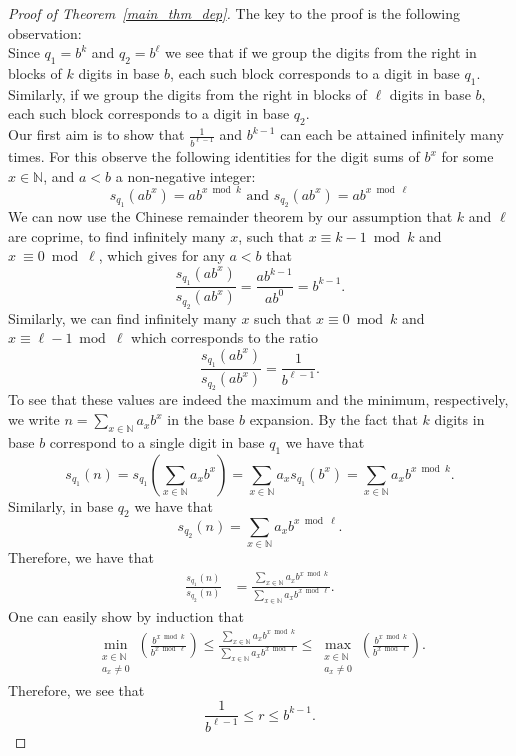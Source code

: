 \documentclass[10pt,a4paper]{amsart}
\newcommand\NN{\mathbb{N}}
\renewcommand{\leq}{\leqslant}
\begin{document}
\begin{proof}[Proof of Theorem~\ref{main_thm_dep}]
	The key to the proof is the following observation:\\
	Since $q_1=b^k$ and $q_2=b^{\ell}$ we see that if we group the digits from the right in blocks of $k$ digits in base $b$, each such block corresponds to a digit in base $q_1$. Similarly, if we group the digits from the right in blocks of $\ell$ digits in base $b$, each such block corresponds to a digit in base $q_2$.\\
	Our first aim is to show that $\frac{1}{b^{\ell-1}}$ and $b^{k-1}$ can each be attained infinitely many times. For this observe the following identities for the digit sums of $b^x$ for some $x\in \NN$, and $a < b$ a non-negative integer:
	\[
	s_{q_1}(ab^x)=ab^{x\bmod k} \text{ and } s_{q_2}(ab^x)=ab^{x\bmod \ell}
	\]
	We can now use the Chinese remainder theorem by our assumption that $k$ and $\ell$ are coprime, to find infinitely many $x$, such that $x\equiv k-1 \bmod k$ and $x~\equiv 0 \bmod \ell$, which gives for any $a< b$ that
	\[
	\frac{s_{q_1}(ab^x)}{s_{q_2}(ab^x)}=\frac{ab^{k-1}}{ab^0}=b^{k-1}.
	\]
	Similarly, we can find infinitely many $x$ such that $x \equiv 0 \bmod k$ and $x\equiv \ell -1 \bmod \ell$ which corresponds to the ratio
	\[
	\frac{s_{q_1}(ab^x)}{s_{q_2}(ab^x)}=\frac{1}{b^{\ell-1}}.
	\]
	To see that these values are indeed the maximum and the minimum, respectively, we write $n=\sum_{x\in \NN}a_xb^x$ in the base $b$ expansion. By the fact that $k$ digits in base $b$ correspond to a single digit in base $q_1$ we have that 
	\[
	s_{q_1}(n) = s_{q_1}\left(\sum_{x\in \NN}a_xb^x\right) = \sum_{x\in \NN}a_xs_{q_1}(b^x)=\sum_{x\in \NN}a_xb^{x\bmod k}.
	\]
	Similarly, in base $q_2$ we have that
	\[
	s_{q_2}(n) =\sum_{x\in \NN}a_xb^{x\bmod \ell}.
	\]
	Therefore, we have that
	\begin{align*}
		\frac{s_{q_1}(n)}{s_{q_2}(n)} &= \frac{\sum_{x\in \NN}a_xb^{x\bmod k}}{\sum_{x\in \NN}a_xb^{x\bmod \ell}}.
	\end{align*}
	One can easily show by induction that
	\begin{align*}
		\min_{\substack{x\in\NN\\a_x\neq 0}}\left(\frac{b^{x\bmod k}}{b^{x\bmod \ell}}\right) \leq \frac{\sum_{x\in \NN}a_xb^{x\bmod k}}{\sum_{x\in \NN}a_xb^{x\bmod \ell}} \leq \max_{\substack{x\in\NN\\a_x\neq 0}}\left(\frac{b^{x\bmod k}}{b^{x\bmod \ell}}\right).
	\end{align*}
	Therefore, we see that 
	\[ 
	\frac{1}{b^{\ell-1}}\leq r \leq b^{k-1}.
\]
\end{proof}
\end{document}

